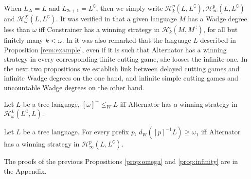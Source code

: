 When $L_{2i}=L$ and $L_{2i+1}=L^\complement$, then we simply write $\mathcal{H}^p_k(L, L^\complement), \mathcal{H}^p_\infty(L, L^\complement)$ and  $\mathcal{H}^{X}_\omega(L, L^\complement)$.
It was verified in \cite{bp} that a given language $M$ has a Wadge degree less than $\omega$ iff Constrainer has a winning strategy in $\mathcal{H}^\varepsilon_k(M, M^\complement)$, for all but finitely many $k<\omega$.
In \cite{bp} it was also remarked that the language $L$ described in Proposition \ref{rem:example}, even  if it is such that Alternator has a winning strategy in every corresponding finite cutting game, she looses the infinite one.
In the next two propositions we establish link between delayed cutting games and infinite Wadge degrees on the one hand, and infinite simple cutting games and uncountable Wadge degrees on the other hand.
\begin{proposition}\label{prop:omega} Let $L$ be a tree language, $[\omega]^+ \leq_W L$ iff Alternator has a winning strategy in $\mathcal{H}^{L}_\omega(L^\complement, L)$. 
\end{proposition}
\begin{proposition}\label{prop:infinity} Let $L$ be a tree language. For every prefix $p$,
$d_W([p]^{-1}L) \geq \omega_1$ iff Alternator has a winning strategy in $\mathcal{H}^p_\infty(L, L^\complement)$. 
\end{proposition}
The proofs of the previous Propositions \ref{prop:omega} and \ref{prop:infinity} are in the Appendix. 

